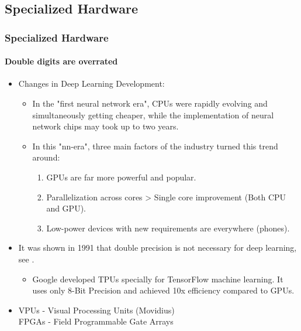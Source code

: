 \documentclass[9pt]{beamer}
\begin{document}
\subsection{Specialized Hardware}
\begin{frame}
\frametitle{Specialized Hardware}
\framesubtitle{Double digits are overrated}
\begin{itemize}
\item Changes in Deep Learning Development:
\begin{itemize}
\item In the "first neural network era", CPUs were rapidly evolving and simultaneously getting cheaper, while the implementation of neural network chips may took up to two years.
\item In this "nn-era", three main factors of the industry turned this trend around:
\begin{enumerate}
\item GPUs are far more powerful and popular.
\item Parallelization across cores > Single core improvement (Both CPU and GPU).
\item Low-power devices with new requirements are everywhere (phones).
\end{enumerate}
\end{itemize}
\item It was shown in 1991 that double precision is not necessary for deep learning, see \cite{Low_Prec}.
\begin{itemize}
\item Google developed TPUs specially for TensorFlow machine learning. It uses only 8-Bit Precision and achieved 10x efficiency compared to GPUs.
\end{itemize}
\item VPUs - Visual Processing Units (Movidius) \\ FPGAs - Field Programmable Gate Arrays
\end{itemize}
\end{frame}
\end{document}
